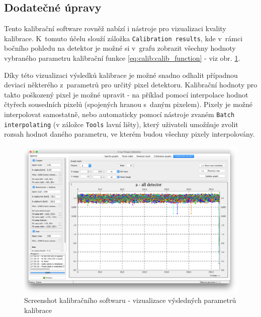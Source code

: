\subsection{Dodatečné úpravy}\label{calib:sw:post_process}
Tento kalibrační software rovněž nabízí i nástroje pro vizualizaci kvality kalibrace. K~tomuto účelu slouží záložka \texttt{Calibration results}, kde v~rámci bočního pohledu na detektor je možné si v~grafu zobrazit všechny hodnoty vybraného parametru kalibrační funkce \ref{eq:calib:calib_function} - viz obr. \ref{fig:calib:sw_calib_results}.

Díky této vizualizaci výsledků kalibrace je možné snadno odhalit případnou deviaci některého z~parametrů pro určitý pixel detektoru. Kalibrační hodnoty pro takto poškozený pixel je možné upravit - na příklad pomocí interpolace hodnot čtyřech sousedních pixelů (spojených hranou s~daným pixelem). Pixely je možné interpolovat samostatně, nebo automaticky pomocí nástroje zvaném \texttt{Batch interpolating} (v záložce \texttt{Tools} lavní lišty), který uživateli umožňuje zvolit rozsah hodnot daného parametru, ve kterém budou všechny pixely interpolovány.

\begin{figure}[t]
	\begin{center}
		\includegraphics[width=16cm]{figures/calibsw_result.png}
		\caption{Screenshot kalibračního softwaru - vizualizace výsledných parametrů kalibrace}
		\label{fig:calib:sw_calib_results}
	\end{center}
\end{figure}









